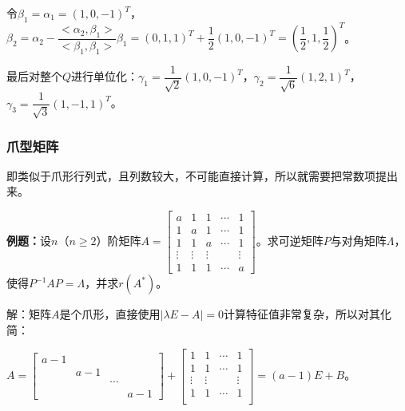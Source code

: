 令$\beta_1=\alpha_1=(1,0,-1)^T$，$\beta_2=\alpha_2-\dfrac{<\alpha_2,\beta_1>}{<\beta_1,\beta_1>}\beta_1=(0,1,1)^T+\dfrac{1}{2}(1,0,-1)^T=(\dfrac{1}{2},1,\dfrac{1}{2})^T$。

最后对整个$Q$进行单位化：$\gamma_1=\dfrac{1}{\sqrt{2}}(1,0,-1)^T$，$\gamma_2=\dfrac{1}{\sqrt{6}}(1,2,1)^T$，$\gamma_3=\dfrac{1}{\sqrt{3}}(1,-1,1)^T$。

\subsubsection{爪型矩阵}

即类似于爪形行列式，且列数较大，不可能直接计算，所以就需要把常数项提出来。

\textbf{例题：}设$n$（$n\geqslant2$）阶矩阵$A=\left[\begin{array}{ccccc}
    a & 1 & 1 & \cdots & 1 \\
    1 & a & 1 & \cdots & 1 \\
    1 & 1 & a & \cdots & 1 \\
    \vdots & \vdots & \vdots &  & \vdots \\
    1 & 1 & 1 & \cdots & a
\end{array}\right]$。求可逆矩阵$P$与对角矩阵$\Lambda$，使得$P^{-1}AP=\Lambda$，并求$r(A^*)$。

解：矩阵$A$是个爪形，直接使用$\vert\lambda E-A\vert=0$计算特征值非常复杂，所以对其化简：

$A=\left[\begin{array}{cccc}
    a-1 \\
    & a-1 \\
    & & \cdots \\
    & & & a-1
\end{array}\right]+\left[\begin{array}{cccc}
    1 & 1 & \cdots & 1 \\
    1 & 1 & \cdots & 1 \\
    \vdots & \vdots & & \vdots \\
    1 & 1 & \cdots & 1 \\
\end{array}\right]=(a-1)E+B$。

